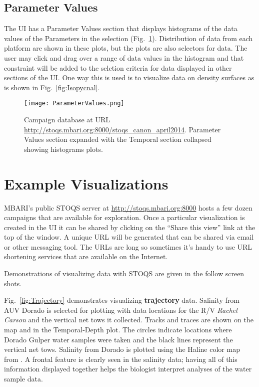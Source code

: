 \documentclass[conference]{IEEEtran}
\begin{document}
\subsection{Parameter Values}

The UI has a Parameter Values section that displays histograms of the data values
of the Parameters in the selection (Fig.~\ref{fig:ParameterValues}). 
Distribution of data from each platform are shown in these plots, 
but the plots are also selectors for data. The user may click and drag over
a range of data values in the histogram and that constraint will be added to the selction criteria
for data displayed in other sections of the UI. One way this is used is to visualize
data on density surfaces as is shown in Fig.~\ref{fig:Isopycnal}.

\begin{figure}[htbp]
\centering
\texttt{[image: ParameterValues.png]}
\caption{Campaign database at URL \url{http://stoqs.mbari.org:8000/stoqs_canon_april2014}. 
Parameter Values section expanded with the Temporal section collapsed 
showing histograms plots.}
\label{fig:ParameterValues}
\end{figure}


\section{Example Visualizations}

MBARI's public STOQS server at \url{http://stoqs.mbari.org:8000} hosts a few dozen 
campaigns that are available for exploration. Once a particular visualization is
created in the UI it can be shared by clicking on the ``Share this view'' link
at the top of the window. A unique URL will be generated that can be shared via 
email or other messaging tool. The URLs are long so sometimes it's handy to use
URL shortening services that are available on the Internet.

Demonstrations of visualizing data with STOQS are given in the follow screen shots.

Fig.~\ref{fig:Trajectory} demonstrates visualizing \textbf{trajectory} data. Salinity from AUV
Dorado is selected for plotting with data locations for the R/V \textit{Rachel Carson} and the vertical net tows it collected.
Tracks and traces are shown on the map and in the Temporal-Depth plot. The circles indicate 
locations where Dorado Gulper water samples were taken and the black lines represent the vertical net tows.
Salinity from Dorado is plotted using the Haline color map from \cite{cmocean}. A frontal feature is clearly seen in 
the salinity data; having all of this information displayed together helps the biologist 
interpret analyses of the water sample data.
\end{document}
